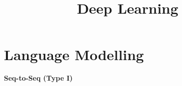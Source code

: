 





\newcommand{\titlefigure}{plots/image_caption.png}
\newcommand{\learninggoals}{
  \item Understand Application to Language Modelling
  \item Get to know Encoder-Decoder Architectures
  \item Learn about further RNN Applications
}

\title{Deep Learning}
\date{}








\section{Language Modelling}

%
%  


\begin{frame}

\vspace{15mm}
\hspace{25mm} \textbf{\LARGE{Seq-to-Seq (Type I)}}
\begin{figure}
      \centering

  \end{figure}
  
\end{frame}

